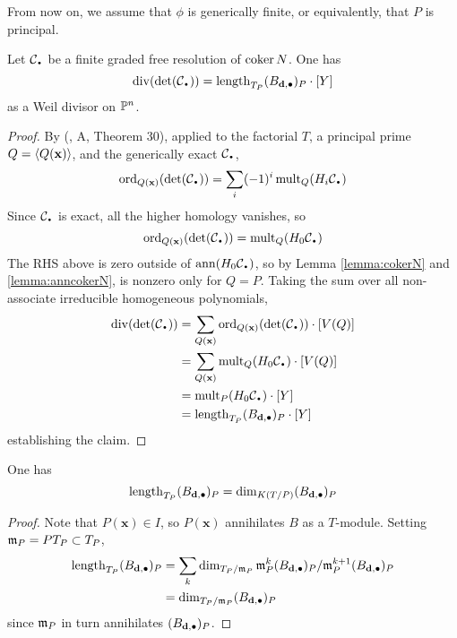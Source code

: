 \documentclass[fleqn,reqno]{amsart}
\numberwithin{first}{chapter}
\begin{document}
\begin{paragraf*}
From now on, we assume that $\phi$ is generically finite, or equivalently,
that $P$ is principal.
\end{paragraf*}

\begin{lemma}
\label{lemma:divdetC}
Let $\mathcal{C}_\nbul$ be a finite graded free resolution of $\operatorname{coker} N$. One has
\[
	\thediv(\det(\mathcal{C}_\nbul))=\length_{T_P}(B_{\d,\bullet})_P\cdot[Y]
\]
as a Weil divisor on $\mathbb{P}^n$.
\end{lemma}

\begin{proof}
By (\citet{GKZ94}, A, Theorem 30), applied to the factorial $T$, a principal prime $Q=\langle Q(\mathbf x)\rangle$,
and the generically exact $\mathcal{C}_\nbul$,
\[
	\ord_{Q(\mathbf x)}(\det(\mathcal{C}_\nbul))=\sum_i (-1)^i \mult_Q(H_i\mathcal{C}_\nbul)
\]
Since $\mathcal{C}_\nbul$ is exact, all the higher homology vanishes, so
\[
	\ord_{Q(\mathbf x)}(\det(\mathcal{C}_\nbul))=\mult_Q(H_0\mathcal{C}_\nbul)
\]
The RHS above is zero outside of $\ann(H_0\mathcal{C}_\nbul)$,
so by Lemma \ref{lemma:cokerN} and \ref{lemma:anncokerN},
is nonzero only for $Q=P$.
Taking the sum over all non-associate irreducible homogeneous polynomials,
\begin{align*}
	\thediv(\det(\mathcal{C}_\nbul))&=\sum_{Q(\mathbf x)}
		\ord_{Q(\mathbf x)}(\det(\mathcal{C}_\nbul))\cdot[V(Q)]\\
	&=\sum_{Q(\mathbf x)} \mult_Q (H_0\mathcal{C}_\nbul)\cdot [V(Q)]\\
	&=\mult_P (H_0\mathcal{C}_\nbul)\cdot[Y]\\
	&=\length_{T_P}(B_{\d,\bullet})_P\cdot[Y]
\end{align*}
establishing the claim.
\end{proof}

\begin{lemma}
\label{lemma:lengthBdimB}
One has
\[
	\operatorname{length}_{T_P}(B_{\mathbf d,\bullet})_P=\dim_{K(T/P)}(B_{\mathbf d,\bullet})_P
\]
\end{lemma}

\begin{proof}
Note that $P(\mathbf x)\in I$, so $P(\mathbf x)$ annihilates $B$ as a $T$-module.
Setting $\mathfrak{m}_P=PT_P\subset T_P$,
\begin{align*}
	\operatorname{length}_{T_P}(B_{\mathbf d,\bullet})_P&=
	\sum_{k}\dim_{T_P/\mathfrak{m}_P} \mathfrak{m}_P^{k}(B_{\mathbf d,\bullet})_P/\mathfrak{m}_P^{k+1}(B_{\mathbf d,\bullet})_P\\
	&=\dim_{T_P/\mathfrak{m}_P}(B_{\mathbf d,\bullet})_P
\end{align*}
since $\mathfrak{m}_P$ in turn annihilates $(B_{\mathbf d,\bullet})_P$.
\end{proof}
\end{document}
